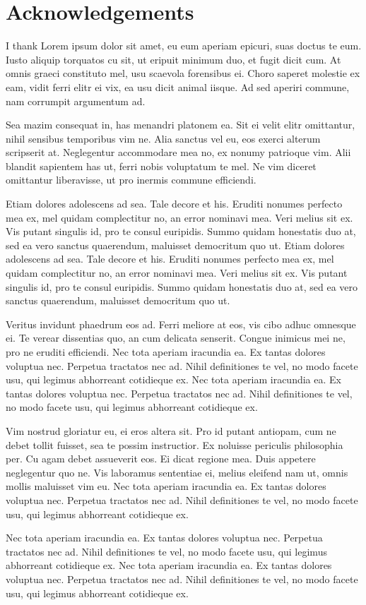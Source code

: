 
\chapter*{Acknowledgements}
\thispagestyle{empty}

I thank Lorem ipsum dolor sit amet, eu eum aperiam epicuri, suas doctus te eum. Iusto aliquip torquatos cu sit, ut eripuit minimum duo, et fugit dicit cum. At omnis graeci constituto mel, usu scaevola forensibus ei. Choro saperet molestie ex eam, vidit ferri elitr ei vix, ea usu dicit animal iisque. Ad sed aperiri commune, nam corrumpit argumentum ad.

Sea mazim consequat in, has menandri platonem ea. Sit ei velit elitr omittantur, nihil sensibus temporibus vim ne. Alia sanctus vel eu, eos exerci alterum scripserit at. Neglegentur accommodare mea no, ex nonumy patrioque vim. Alii blandit sapientem has ut, ferri nobis voluptatum te mel. Ne vim diceret omittantur liberavisse, ut pro inermis commune efficiendi.

Etiam dolores adolescens ad sea. Tale decore et his. Eruditi nonumes perfecto mea ex, mel quidam complectitur no, an error nominavi mea. Veri melius sit ex. Vis putant singulis id, pro te consul euripidis. Summo quidam honestatis duo at, sed ea vero sanctus quaerendum, maluisset democritum quo ut. Etiam dolores adolescens ad sea. Tale decore et his. Eruditi nonumes perfecto mea ex, mel quidam complectitur no, an error nominavi mea. Veri melius sit ex. Vis putant singulis id, pro te consul euripidis. Summo quidam honestatis duo at, sed ea vero sanctus quaerendum, maluisset democritum quo ut.

Veritus invidunt phaedrum eos ad. Ferri meliore at eos, vis cibo adhuc omnesque ei. Te verear dissentias quo, an cum delicata senserit. Congue inimicus mei ne, pro ne eruditi efficiendi. Nec tota aperiam iracundia ea. Ex tantas dolores voluptua nec. Perpetua tractatos nec ad. Nihil definitiones te vel, no modo facete usu, qui legimus abhorreant cotidieque ex. Nec tota aperiam iracundia ea. Ex tantas dolores voluptua nec. Perpetua tractatos nec ad. Nihil definitiones te vel, no modo facete usu, qui legimus abhorreant cotidieque ex.

Vim nostrud gloriatur eu, ei eros altera sit. Pro id putant antiopam, cum ne debet tollit fuisset, sea te possim instructior. Ex noluisse periculis philosophia per. Cu agam debet assueverit eos. Ei dicat regione mea. Duis appetere neglegentur quo ne. Vis laboramus sententiae ei, melius eleifend nam ut, omnis mollis maluisset vim eu. Nec tota aperiam iracundia ea. Ex tantas dolores voluptua nec. Perpetua tractatos nec ad. Nihil definitiones te vel, no modo facete usu, qui legimus abhorreant cotidieque ex.

Nec tota aperiam iracundia ea. Ex tantas dolores voluptua nec. Perpetua tractatos nec ad. Nihil definitiones te vel, no modo facete usu, qui legimus abhorreant cotidieque ex. Nec tota aperiam iracundia ea. Ex tantas dolores voluptua nec. Perpetua tractatos nec ad. Nihil definitiones te vel, no modo facete usu, qui legimus abhorreant cotidieque ex.

